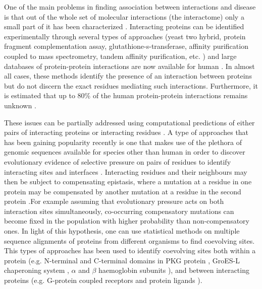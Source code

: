 One of the main problems in finding association between interactions and disease is that out of the whole set of molecular interactions (the interactome) only a small part of it has been characterized \cite{venkatesan2009empirical}. Interacting proteins can be identified experimentally through several types of approaches (yeast two hybrid, protein fragment complementation assay, glutathione-s-transferase, affinity purification coupled to mass spectrometry, tandem affinity purification, etc. \cite{shoemaker2007deciphering}) and large databases of protein-protein interactions are now available for human \cite{stark2006biogrid, shoemaker2007deciphering}. In almost all cases, these methods identify the presence of an interaction between proteins but do not discern the exact residues mediating such interactions. Furthermore, it is estimated that up to 80\% of the human protein-protein interactions remains unknown \cite{venkatesan2009empirical}.

These issues can be partially addressed using computational predictions of either pairs of interacting proteins or interacting residues \cite{shoemaker2007decipheringP2}. A type of approaches that has been gaining popularity recently is one that makes use of the plethora of genomic sequences available for species other than human in order to discover evolutionary evidence of selective pressure on pairs of residues to identify interacting sites and interfaces \cite{marks2012protein}. Interacting residues and their neighbours may then be subject to compensating epistasis, where a mutation at a residue in one protein may be compensated by another mutation at a residue in the second protein \cite{pazos1997correlated}.For example assuming that evolutionary pressure acts on both interaction sites simultaneously, co-occurring compensatory mutations can become fixed in the population with higher probability than non-compensatory ones. In light of this hypothesis, one can use statistical methods on multiple sequence alignments of proteins from different organisms to find coevolving sites. This types of approaches has been used to identify coevolving sites both within a protein (e.g. N-terminal and C-terminal domains in PKG protein \cite{goh2000co}, GroES-L chaperoning system \cite{ruiz2013coevolution}, $\alpha$ and $\beta$ haemoglobin subunits \cite{pazos1997correlated}), and between interacting proteins (e.g. G-protein coupled receptors and protein ligands \cite{goh2000co}).

